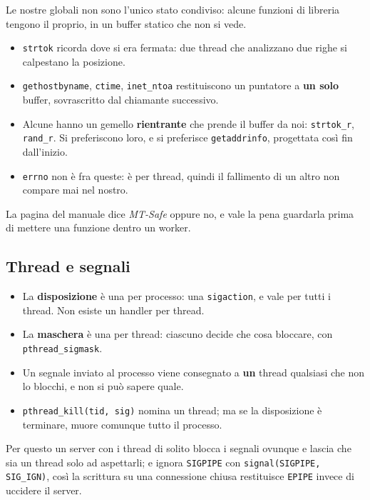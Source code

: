 Le nostre globali non sono l'unico stato condiviso: alcune funzioni di libreria tengono il proprio, in un buffer statico
che non si vede.
\begin{itemize}
    \item \texttt{strtok} ricorda dove si era fermata: due thread che analizzano due righe si calpestano la posizione.
    \item \texttt{gethostbyname}, \texttt{ctime}, \texttt{inet\_ntoa} restituiscono un puntatore a \textbf{un solo} buffer,
          sovrascritto dal chiamante successivo.
    \item Alcune hanno un gemello \textbf{rientrante} che prende il buffer da noi: \texttt{strtok\_r}, \texttt{rand\_r}. Si
          preferiscono loro, e si preferisce \texttt{getaddrinfo}, progettata così fin dall'inizio.
    \item \texttt{errno} non è fra queste: è per thread, quindi il fallimento di un altro non compare mai nel nostro.
\end{itemize}
La pagina del manuale dice \emph{MT-Safe} oppure no, e vale la pena guardarla prima di mettere una funzione dentro un worker.

\subsection{Thread e segnali}

\begin{itemize}
    \item La \textbf{disposizione} è una per processo: una \texttt{sigaction}, e vale per tutti i thread. Non esiste un
          handler per thread.
    \item La \textbf{maschera} è una per thread: ciascuno decide che cosa bloccare, con \texttt{pthread\_sigmask}.
    \item Un segnale inviato al processo viene consegnato a \textbf{un} thread qualsiasi che non lo blocchi, e non si può
          sapere quale.
    \item \texttt{pthread\_kill(tid, sig)} nomina un thread; ma se la disposizione è terminare, muore comunque tutto il
          processo.
\end{itemize}
Per questo un server con i thread di solito blocca i segnali ovunque e lascia che sia un thread solo ad aspettarli; e
ignora \texttt{SIGPIPE} con \texttt{signal(SIGPIPE, SIG\_IGN)}, così la scrittura su una connessione chiusa restituisce
\texttt{EPIPE} invece di uccidere il server.

